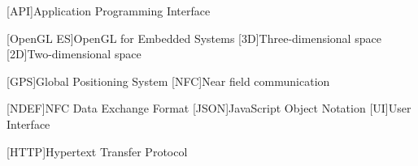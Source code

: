 [API]{Application Programming Interface}

[OpenGL ES]{OpenGL for Embedded Systems}
[3D]{Three-dimensional space}
[2D]{Two-dimensional space}

[GPS]{Global Positioning System}
[NFC]{Near field communication}

[NDEF]{NFC Data Exchange Format}
[JSON]{JavaScript Object Notation}
[UI]{User Interface}

[HTTP]{Hypertext Transfer Protocol}

